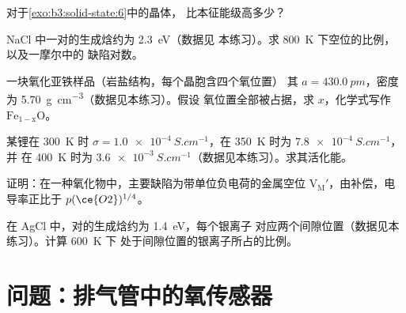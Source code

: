 \begin{exercise}[$\star\star$]\label{exo:b3:solid-state:7}
对于\cref{exo:b3:solid-state:6}中的晶体，
比本征能级高多少？
\end{exercise}

\begin{exercise}[$\star\star$]\label{exo:b3:solid-state:8}
NaCl 中一对的生成焓约为 \qty{2.3}{eV}（数据见
本练习）。求 \qty{800}{K} 下空位的比例，以及一摩尔中的
缺陷对数。
\end{exercise}

\begin{exercise}[$\star\star$]\label{exo:b3:solid-state:9}
一块氧化亚铁样品（岩盐结构，每个晶胞含四个氧位置）
其 $a = \qty{430.0}{pm}$，密度为 \qty{5.70}{g.cm^{-3}}（数据见本练习）。假设
氧位置全部被占据，求 $x$，化学式写作 $\mathrm{Fe_{1-x}O}$。
\end{exercise}

\begin{exercise}[$\star\star\star$]\label{exo:b3:solid-state:10}
某锂在 \qty{300}{K} 时 $\sigma = \qty{1.0e-4}{S.cm^{-1}}$，在 \qty{350}{K} 时为 $\qty{7.8e-4}{S.cm^{-1}}$，并
在 \qty{400}{K} 时为 $\qty{3.6e-3}{S.cm^{-1}}$（数据见本练习）。求其活化能。
\end{exercise}

\begin{exercise}[$\star\star\star$]\label{exo:b3:solid-state:11}
证明：在一种氧化物中，主要缺陷为带单位负电荷的金属空位
$\mathrm{V_M'}$，由补偿，电导率正比于 $p(\ce{O2})^{1/4}$。
\end{exercise}

\begin{exercise}[$\star\star\star$]\label{exo:b3:solid-state:12}
在 AgCl 中，对的生成焓约为 \qty{1.4}{eV}，每个银离子
对应两个间隙位置（数据见本练习）。计算 \qty{600}{K} 下
处于间隙位置的银离子所占的比例。
\end{exercise}

\section{问题：排气管中的氧传感器}

